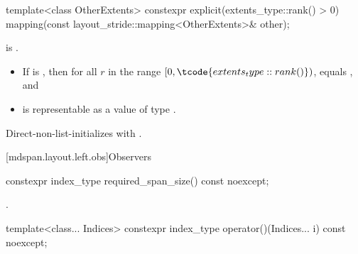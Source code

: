 %
\begin{itemdecl}
template<class OtherExtents>
  constexpr explicit(extents_type::rank() > 0)
    mapping(const layout_stride::mapping<OtherExtents>& other);
\end{itemdecl}

\begin{itemdescr}
\pnum
\constraints
{} is .

\pnum
\expects
\begin{itemize}
\item
If  is ,
then for all $r$ in the range $[0, \tcode{extents_type::rank()})$,
 equals
, and
\item
{} is representable as
a value of type .
\end{itemize}

\pnum
\effects
Direct-non-list-initializes  with .
\end{itemdescr}

[mdspan.layout.left.obs]{Observers}

%
\begin{itemdecl}
constexpr index_type required_span_size() const noexcept;
\end{itemdecl}

\begin{itemdescr}
\pnum
\returns
{}.
\end{itemdescr}

%
\begin{itemdecl}
template<class... Indices>
  constexpr index_type operator()(Indices... i) const noexcept;
\end{itemdecl}

